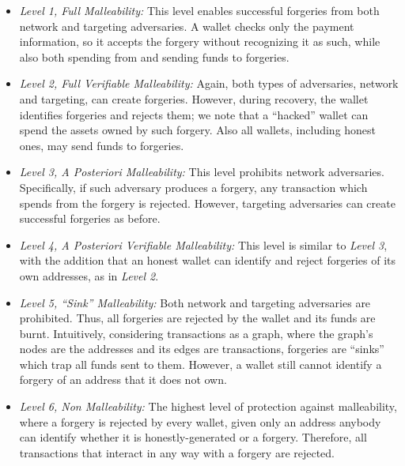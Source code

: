 \begin{itemize}
    \item \emph{Level 1, Full Malleability:} This level enables successful
        forgeries from both network and targeting adversaries. A wallet checks
        only the payment information, so it accepts the forgery without
        recognizing it as such, while also both spending from and sending funds
        to forgeries.
    \item \emph{Level 2, Full Verifiable Malleability:} Again, both types of
        adversaries, \ie network and targeting, can create forgeries. However,
        during recovery, the wallet identifies forgeries and rejects them; we
        note that a ``hacked'' wallet can spend the assets
        owned by such forgery. Also all wallets, including honest ones, may
        send funds to forgeries.
    \item \emph{Level 3, A Posteriori Malleability:} This level prohibits
        network adversaries. Specifically, if such adversary produces a
        forgery, any transaction which spends from the forgery is rejected.
        However, targeting adversaries can create successful forgeries as
        before.
    \item \emph{Level 4, A Posteriori Verifiable Malleability:} This level is
        similar to \emph{Level 3}, with the addition that an honest wallet can
        identify and reject forgeries of its own addresses, as in \emph{Level
        2}.
    \item \emph{Level 5, ``Sink'' Malleability:} Both network and targeting
        adversaries are prohibited. Thus, all forgeries are rejected by the
        wallet and its funds are burnt. Intuitively, considering
        transactions as a graph, where the graph's nodes are the addresses and
        its edges are transactions, forgeries are ``sinks'' which trap all
        funds sent to them. However, a wallet still cannot identify a forgery
        of an address that it does not own.
    \item \emph{Level 6, Non Malleability:} The highest level of
        protection against malleability, where a forgery is rejected by every
        wallet, \ie given only an address anybody can identify whether it is
        honestly-generated or a forgery. Therefore, all transactions that
        interact in any way with a forgery are rejected.
\end{itemize}


